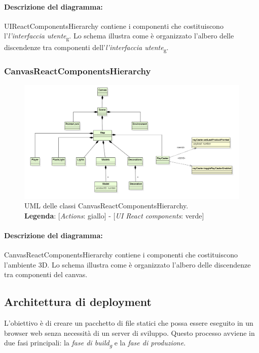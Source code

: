 \paragraph*{Descrizione del diagramma:}
UIReactComponentsHierarchy contiene i componenti che costituiscono l'\textit{l'interfaccia 
		utente}\textsubscript{g}.
Lo schema illustra come è organizzato l'albero delle discendenze tra componenti dell'\textit{l'interfaccia 
		utente}\textsubscript{g}.
\begin{landscape}
\thispagestyle{empty}
\subsubsection{CanvasReactComponentsHierarchy}
\begin{figure}[H]
	\centering
	\includegraphics[scale=0.7 , keepaspectratio]{./res/images/canvasReactComponentsHierarchy.PNG}
	\caption[UML delle classi CanvasReactComponentsHierarchy]{
	UML delle classi CanvasReactComponentsHierarchy.
	\\
	\textbf{Legenda}: 
	[\textit{Actions}: giallo] -
	[\textit{UI React components}: verde]}
\end{figure}
\end{landscape}
\restoregeometry

\paragraph*{Descrizione del diagramma:}
CanvasReactComponentsHierarchy contiene i componenti che costituiscono l'ambiente 3D.
Lo schema illustra come è organizzato l'albero delle discendenze tra componenti del canvas.

\subsection{Architettura di deployment}
L'obiettivo è di creare un pacchetto di file statici che possa essere eseguito in un browser web senza necessità di un server di sviluppo.
Questo processo avviene in due fasi principali: la \textit{fase di build\textsubscript{g}} e la \textit{fase di produzione}.
